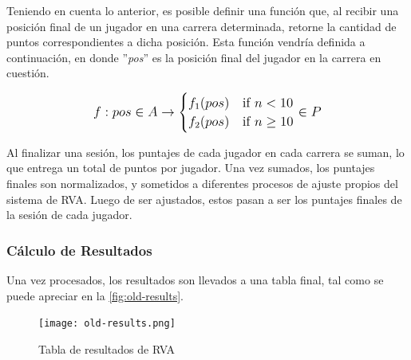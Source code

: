 Teniendo en cuenta lo anterior, es posible definir una función que, al recibir una posición final de un jugador en una carrera determinada, retorne la cantidad de puntos correspondientes a dicha posición. Esta función vendría definida a continuación, en donde ''\textit{pos}'' es la posición final del jugador en la carrera en cuestión.

\[
\mathlarger{
f : pos \in A \to 
\begin{cases}
	f_1(pos) & \text{if } n < 10\\
	f_2(pos) & \text{if } n \geq 10
\end{cases}
\in P
}
\]

Al finalizar una sesión, los puntajes de cada jugador en cada carrera se suman, lo que entrega un total de puntos por jugador. Una vez sumados, los puntajes finales son normalizados, y sometidos a diferentes procesos de ajuste propios del sistema de RVA. Luego de ser ajustados, estos pasan a ser los puntajes finales de la sesión de cada jugador.

\newpage

\subsubsection{Cálculo de Resultados}
Una vez procesados, los resultados son llevados a una tabla final, tal como se puede apreciar en la \autoref{fig:old-results}.

\begin{figure}[H]
  \begin{center}
    \texttt{[image: old-results.png]}
  \end{center}
  \caption[Tabla de resultados de RVA]{Tabla de resultados de RVA}
  \label{fig:old-results}
\end{figure}

